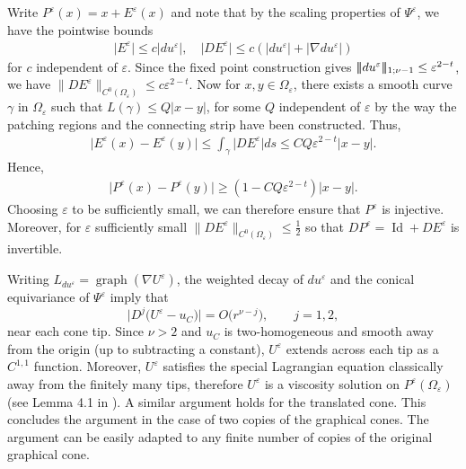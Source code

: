 \documentclass[11pt]{amsart}
\DeclarePairedDelimiter{\tnorm}{\vert\!\vert\!\vert}{\vert\!\vert\!\vert}
\theoremstyle{definition}
\theoremstyle{remark}
\begin{document}
Write $P^\varepsilon(x)=x+E^\varepsilon(x)$ and note that by the scaling properties of $\Psi^\varepsilon$, we have the pointwise bounds
\begin{align*}
    \lvert E^\varepsilon\rvert\leq c\lvert du^\varepsilon\rvert,\quad \lvert DE^\varepsilon\rvert\leq c(\lvert du^\varepsilon\rvert+\lvert\nabla du^\varepsilon\rvert)
\end{align*}
for $c$ independent of $\varepsilon$.
Since the fixed point construction gives $\tnorm{du^\varepsilon}_{1;\nu-1}\leq \varepsilon^{2-t}$, we have $\lVert DE^\varepsilon\rVert_{C^0(\Omega_\varepsilon)}\leq c\varepsilon^{2-t}$.
Now for $x,y\in \Omega_\varepsilon$, there exists a smooth curve $\gamma$ in $\Omega_\varepsilon$ such that $L(\gamma)\leq Q\lvert x-y\rvert$, for some $Q$ independent of $\varepsilon$ by the way the patching regions and the connecting strip have been constructed. Thus,
\begin{align*}
    \lvert E^\varepsilon(x)-E^\varepsilon(y)\rvert\leq\int_\gamma\lvert DE^\varepsilon\rvert ds\leq CQ\varepsilon^{2-t}\lvert x-y\rvert.
\end{align*}
Hence,
\begin{align*}
    \lvert P^\varepsilon(x)-P^\varepsilon(y)\rvert\geq (1-CQ\varepsilon^{2-t})\lvert x-y\rvert.
\end{align*}
Choosing $\varepsilon$ to be sufficiently small, we can therefore ensure that $P^\varepsilon$ is injective. Moreover, for $\varepsilon$ sufficiently small $\lVert DE^\varepsilon\rVert_{C^0(\Omega_\varepsilon)}\leq \frac{1}{2}$ so that $DP^\varepsilon=\operatorname{Id}+DE^\varepsilon$ is invertible.

Writing $L_{du^\varepsilon}=\operatorname{graph}(\nabla U ^\varepsilon)$, the weighted decay of $du^\varepsilon$ and the conical equivariance of $\Psi^\varepsilon$ imply that
\[
    \lvert D^j\bigl(U^\varepsilon-u_C\bigr)\rvert
    = O\bigl(r^{\nu-j}\bigr),
    \qquad j=1,2,
\]
near each cone tip. Since $\nu>2$ and $u_C$ is two-homogeneous and smooth
away from the origin (up to subtracting a constant), $U^\varepsilon$ extends across each tip as a
$C^{1,1}$ function. Moreover, $U^\varepsilon$ satisfies the special
Lagrangian equation classically away from the finitely many tips, therefore
$U^\varepsilon$ is a viscosity solution on $P^\varepsilon(\Omega_\varepsilon)$ (see Lemma 4.1 in \cite{BOS26}).
A similar argument holds for the translated cone.
This concludes the argument in the case of two copies of the graphical cones. The argument can be easily adapted to any finite number of copies of the original graphical cone.
\end{document}
